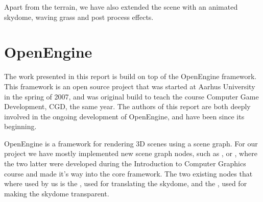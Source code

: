 Apart from the terrain, we have also extended the scene with an
animated skydome, waving grass and post process effects.



\section{OpenEngine}
The work presented in this report is build on top of the OpenEngine
framework. This framework is an open source project that was started
at Aarhus University in the spring of 2007, and was original build to
teach the course Computer Game Development, CGD, the same year. The
authors of this report are both deeply involved in the ongoing
development of OpenEngine, and have been since its beginning.

OpenEngine is a framework for rendering 3D scenes using a scene graph.
For our project we have mostly implemented new scene graph nodes, such
as ,  or ,
where the two latter were developed during the Introduction to
Computer Graphics course and made it's way into the core
framework. The two existing nodes that where used by us is the
, used for translating the skydome, and the
, used for making the skydome transparent.\\

